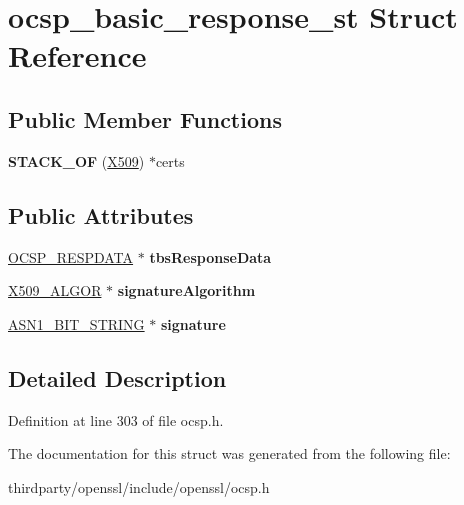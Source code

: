 \hypertarget{structocsp__basic__response__st}{}\section{ocsp\+\_\+basic\+\_\+response\+\_\+st Struct Reference}
\label{structocsp__basic__response__st}
\subsection*{Public Member Functions}
\begin{DoxyCompactItemize}
\item 
\mbox{\label{structocsp__basic__response__st_aedc45c00d3c3a3b4a971235ff5ab3545}} 
{\bfseries S\+T\+A\+C\+K\+\_\+\+OF} (\hyperlink{structx509__st}{X509}) $\ast$certs
\end{DoxyCompactItemize}
\subsection*{Public Attributes}
\begin{DoxyCompactItemize}
\item 
\mbox{\label{structocsp__basic__response__st_a09c6bafbf175745b5919a3e15055354c}} 
\hyperlink{structocsp__response__data__st}{O\+C\+S\+P\+\_\+\+R\+E\+S\+P\+D\+A\+TA} $\ast$ {\bfseries tbs\+Response\+Data}
\item 
\mbox{\label{structocsp__basic__response__st_aaf4560b99757f89823b63d97c5e5487b}} 
\hyperlink{struct_x509__algor__st}{X509\+\_\+\+A\+L\+G\+OR} $\ast$ {\bfseries signature\+Algorithm}
\item 
\mbox{\label{structocsp__basic__response__st_afce61e2065685eaea0d539e366fe3cee}} 
\hyperlink{structasn1__string__st}{A\+S\+N1\+\_\+\+B\+I\+T\+\_\+\+S\+T\+R\+I\+NG} $\ast$ {\bfseries signature}
\end{DoxyCompactItemize}


\subsection{Detailed Description}


Definition at line 303 of file ocsp.\+h.



The documentation for this struct was generated from the following file\+:\begin{DoxyCompactItemize}
\item 
thirdparty/openssl/include/openssl/ocsp.\+h\end{DoxyCompactItemize}
